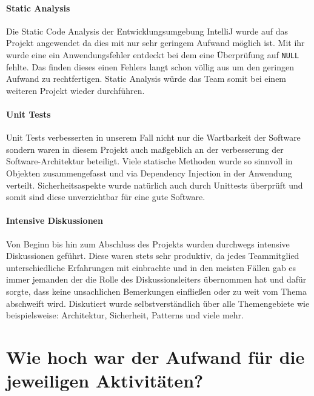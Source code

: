 \documentclass[12pt,DIV14,BCOR10mm,a4paper,parskip=half-,headsepline,headinclude,english,ngerman,bibliography=totocnumbered]{scrreprt}
\begin{document}
\paragraph{Static Analysis} Die Static Code Analysis der Entwicklungsumgebung IntelliJ wurde auf das Projekt angewendet da dies mit nur sehr geringem Aufwand möglich ist. Mit ihr wurde eine ein Anwendungsfehler entdeckt bei dem eine Überprüfung auf \texttt{NULL} fehlte. Das finden dieses einen Fehlers langt schon völlig aus um den geringen Aufwand zu rechtfertigen. Static Analysis würde das Team somit bei einem weiteren Projekt wieder durchführen.

\paragraph{Unit Tests} Unit Tests verbesserten in unserem Fall nicht nur die Wartbarkeit der Software sondern waren in diesem Projekt auch maßgeblich an der verbesserung der Software-Architektur beteiligt. Viele statische Methoden wurde so sinnvoll in Objekten zusammengefasst und via Dependency Injection in der Anwendung verteilt. Sicherheitsaspekte wurde natürlich auch durch Unittests überprüft und somit sind diese unverzichtbar für eine gute Software.

\paragraph{Intensive Diskussionen} Von Beginn bis hin zum Abschluss des Projekts wurden durchwegs intensive Diskussionen geführt. Diese waren stets sehr produktiv, da jedes Teammitglied unterschiedliche Erfahrungen mit einbrachte und in den meisten Fällen gab es immer jemanden der die Rolle des Diskussionsleiters übernommen hat und dafür sorgte, dass keine unsachlichen Bemerkungen einfließen oder zu weit vom Thema abschweift wird. Diskutiert wurde selbstverständlich über alle Themengebiete wie beispielsweise: Architektur, Sicherheit, Patterns und viele mehr.

\section{Wie hoch war der Aufwand für die jeweiligen Aktivitäten?}
\end{document}

